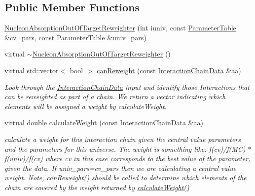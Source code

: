 \subsection*{Public Member Functions}
\begin{DoxyCompactItemize}
\item 
\hyperlink{class_neutrino_flux_reweight_1_1_nucleon_absorption_out_of_target_reweighter_a8195d5b2b35f7f1b7f8277556e0ed625}{Nucleon\-Absorption\-Out\-Of\-Target\-Reweighter} (int iuniv, const \hyperlink{class_neutrino_flux_reweight_1_1_parameter_table}{Parameter\-Table} \&cv\-\_\-pars, const \hyperlink{class_neutrino_flux_reweight_1_1_parameter_table}{Parameter\-Table} \&univ\-\_\-pars)
\item 
virtual \hyperlink{class_neutrino_flux_reweight_1_1_nucleon_absorption_out_of_target_reweighter_a4277a8f10a85466466ee10884b6e8f5f}{$\sim$\-Nucleon\-Absorption\-Out\-Of\-Target\-Reweighter} ()
\item 
virtual std\-::vector$<$ bool $>$ \hyperlink{class_neutrino_flux_reweight_1_1_nucleon_absorption_out_of_target_reweighter_a978c4e5458a827ff091c990b34515fb7}{can\-Reweight} (const \hyperlink{class_neutrino_flux_reweight_1_1_interaction_chain_data}{Interaction\-Chain\-Data} \&aa)
\begin{DoxyCompactList}\small\item\em Look through the \hyperlink{class_neutrino_flux_reweight_1_1_interaction_chain_data}{Interaction\-Chain\-Data} input and identify those Interactions that can be reweighted as part of a chain. We return a vector indicating which elements will be assigned a weight by calculate\-Weight. \end{DoxyCompactList}\item 
virtual double \hyperlink{class_neutrino_flux_reweight_1_1_nucleon_absorption_out_of_target_reweighter_a295719b84abffcab3d2cdf3a4aadb7b7}{calculate\-Weight} (const \hyperlink{class_neutrino_flux_reweight_1_1_interaction_chain_data}{Interaction\-Chain\-Data} \&aa)
\begin{DoxyCompactList}\small\item\em calculate a weight for this interaction chain given the central value parameters and the parameters for this universe. The weight is something like\-: f(cv)/f(M\-C) $\ast$ f(univ)/f(cv) where cv in this case corresponds to the best value of the parameter, given the data. If univ\-\_\-pars=cv\-\_\-pars then we are calculating a central value weight. Note, \hyperlink{class_neutrino_flux_reweight_1_1_nucleon_absorption_out_of_target_reweighter_a978c4e5458a827ff091c990b34515fb7}{can\-Reweight()} should be called to determine which elements of the chain are covered by the weight returned by \hyperlink{class_neutrino_flux_reweight_1_1_nucleon_absorption_out_of_target_reweighter_a295719b84abffcab3d2cdf3a4aadb7b7}{calculate\-Weight()} \end{DoxyCompactList}\end{DoxyCompactItemize}
